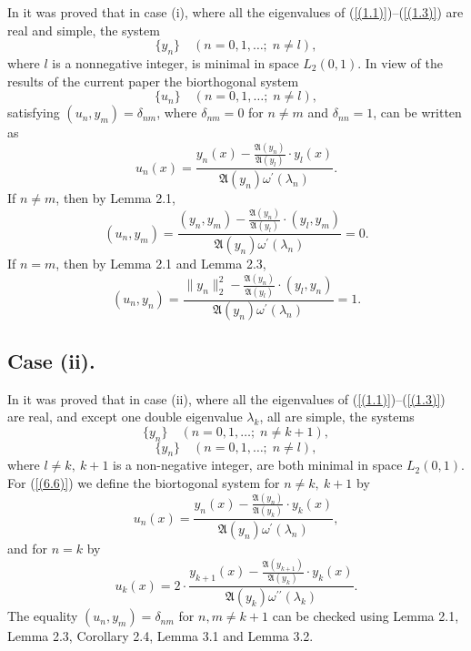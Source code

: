 \documentclass[10pt,a4paper]{amsart}
\numberwithin{equation}{section}
\begin{document}
 In \cite{aliyev5} it was proved that in case (i), where  all the eigenvalues of (\ref{(1.1)})--(\ref{(1.3)}) are real and simple, the system
\begin{equation}
  \{ y_n \} \quad (n = 0,1,\ldots;\; n \neq l), \label{(6.1)} 
\end{equation}
where $l$ is a nonnegative integer, is minimal in space $L_2(0,1)$. In view of the results of the current paper the biorthogonal system
\begin{equation}
\{ u_n \} \quad (n = 0,1,\ldots;\; n \neq l), \label{(6.2)}
\end{equation}
satisfying $(u_n, y_m) = \delta_{nm}$, where $\delta_{nm}=0$ for $n \neq m$ and $\delta_{nn}=1$, can be written as 
\begin{equation}
u_n(x)=\frac{y_n(x)-\frac{\mathfrak{A}(y_{n})}{\mathfrak{A}(y_l)}\cdot y_l(x)}{ \mathfrak{A}(y_{n})\omega^\prime(\lambda_n)}
. \label{(6.3)}
\end{equation}
If $n\neq m$, then by Lemma 2.1,
\begin{equation}
(u_n, y_m)=\frac{(y_n,y_m)-\frac{\mathfrak{A}(y_{n})}{\mathfrak{A}(y_l)}\cdot (y_l, y_m)}{ \mathfrak{A}(y_{n})\omega^\prime(\lambda_n)}=0.
\label{(6.4)}
\end{equation}
If $n=m$, then by Lemma 2.1 and Lemma 2.3,
\begin{equation}
(u_n, y_n)=\frac{\|y_n\|_2^2-\frac{\mathfrak{A}(y_{n})}{\mathfrak{A}(y_l)}\cdot (y_l, y_n)}{ \mathfrak{A}(y_{n})\omega^\prime(\lambda_n)}=1.
\label{(6.5)}
\end{equation}

\subsection{Case (ii).}



In \cite{aliyev5} it was proved that in case (ii), where  all the eigenvalues of (\ref{(1.1)})--(\ref{(1.3)}) are real, and except one double eigenvalue $\lambda_k$, all are simple, the systems
\begin{equation}
  \{ y_n \} \quad (n = 0,1,\ldots;\; n \neq k+1), \label{(6.6)} 
\end{equation}
\begin{equation}
  \{ y_n \} \quad (n = 0,1,\ldots;\; n \neq l), \label{(6.12)} 
\end{equation}
where $l \ne k,\ k+1$ is a non-negative integer, are both minimal in space $L_2(0,1)$. For (\ref{(6.6)}) we define the biortogonal system for $n \ne k,\ k+1$ by
\begin{equation}
u_n(x)=\frac{y_n(x)-\frac{\mathfrak{A}(y_{n})}{\mathfrak{A}(y_k)}\cdot y_k(x)}{ \mathfrak{A}(y_{n})\omega^\prime(\lambda_n)}
, \label{(6.7)}
\end{equation}
and for $n = k$ by
\begin{equation}
u_k(x)=2\cdot\frac{y_{k+1}(x)-\frac{\mathfrak{A}(y_{k+1})}{\mathfrak{A}(y_k)}\cdot y_k(x)}{ \mathfrak{A}(y_k)\omega^{\prime\prime}(\lambda_k)}
. \label{(6.8)}
\end{equation}
The equality $(u_n, y_m) = \delta_{nm}$ for $ n,m\neq k+1$ can be checked using Lemma 2.1, Lemma 2.3, Corollary 2.4, Lemma 3.1 and Lemma 3.2.
\end{document}
